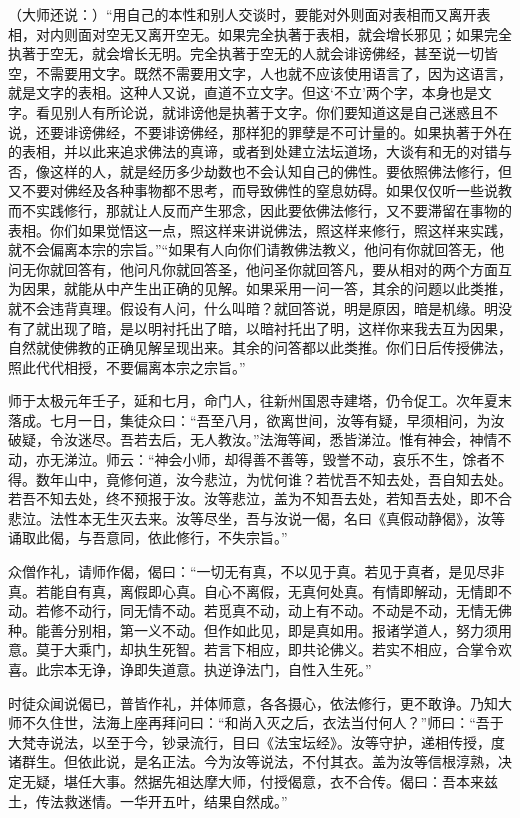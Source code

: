 \documentclass[12pt,twoside,openany]{book}
\newcommand{\kai}[1]{{\CJKfamily{kai}#1}}
\begin{document}
\kai{（大师还说：）“用自己的本性和别人交谈时，要能对外则面对表相而又离开表相，对内则面对空无又离开空无。如果完全执著于表相，就会增长邪见；如果完全执著于空无，就会增长无明。完全执著于空无的人就会诽谤佛经，甚至说一切皆空，不需要用文字。既然不需要用文字，人也就不应该使用语言了，因为这语言，就是文字的表相。这种人又说，直道不立文字。但这‘不立’两个字，本身也是文字。看见别人有所论说，就诽谤他是执著于文字。你们要知道这是自己迷惑且不说，还要诽谤佛经，不要诽谤佛经，那样犯的罪孽是不可计量的。如果执著于外在的表相，并以此来追求佛法的真谛，或者到处建立法坛道场，大谈有和无的对错与否，像这样的人，就是经历多少劫数也不会认知自己的佛性。要依照佛法修行，但又不要对佛经及各种事物都不思考，而导致佛性的窒息妨碍。如果仅仅听一些说教而不实践修行，那就让人反而产生邪念，因此要依佛法修行，又不要滞留在事物的表相。你们如果觉悟这一点，照这样来讲说佛法，照这样来修行，照这样来实践，就不会偏离本宗的宗旨。”“如果有人向你们请教佛法教义，他问有你就回答无，他问无你就回答有，他问凡你就回答圣，他问圣你就回答凡，要从相对的两个方面互为因果，就能从中产生出正确的见解。如果采用一问一答，其余的问题以此类推，就不会违背真理。假设有人问，什么叫暗？就回答说，明是原因，暗是机缘。明没有了就出现了暗，是以明衬托出了暗，以暗衬托出了明，这样你来我去互为因果，自然就使佛教的正确见解呈现出来。其余的问答都以此类推。你们日后传授佛法，照此代代相授，不要偏离本宗之宗旨。”}

师于太极元年壬子，延和七月，命门人，往新州国恩寺建塔，仍令促工。次年夏末落成。七月一日，集徒众曰：“吾至八月，欲离世间，汝等有疑，早须相问，为汝破疑，令汝迷尽。吾若去后，无人教汝。”法海等闻，悉皆涕泣。惟有神会，神情不动，亦无涕泣。师云：“神会小师，却得善不善等，毁誉不动，哀乐不生，馀者不得。数年山中，竟修何道，汝今悲泣，为忧何谁？若忧吾不知去处，吾自知去处。若吾不知去处，终不预报于汝。汝等悲泣，盖为不知吾去处，若知吾去处，即不合悲泣。法性本无生灭去来。汝等尽坐，吾与汝说一偈，名曰《真假动静偈》，汝等诵取此偈，与吾意同，依此修行，不失宗旨。”

众僧作礼，请师作偈，偈曰：“一切无有真，不以见于真。若见于真者，是见尽非真。若能自有真，离假即心真。自心不离假，无真何处真。有情即解动，无情即不动。若修不动行，同无情不动。若觅真不动，动上有不动。不动是不动，无情无佛种。能善分别相，第一义不动。但作如此见，即是真如用。报诸学道人，努力须用意。莫于大乘门，却执生死智。若言下相应，即共论佛义。若实不相应，合掌令欢喜。此宗本无诤，诤即失道意。执逆诤法门，自性入生死。”

时徒众闻说偈已，普皆作礼，并体师意，各各摄心，依法修行，更不敢诤。乃知大师不久住世，法海上座再拜问曰：“和尚入灭之后，衣法当付何人？”师曰：“吾于大梵寺说法，以至于今，钞录流行，目曰《法宝坛经》。汝等守护，递相传授，度诸群生。但依此说，是名正法。今为汝等说法，不付其衣。盖为汝等信根淳熟，决定无疑，堪任大事。然据先祖达摩大师，付授偈意，衣不合传。偈曰：吾本来兹土，传法救迷情。一华开五叶，结果自然成。”
\end{document}
